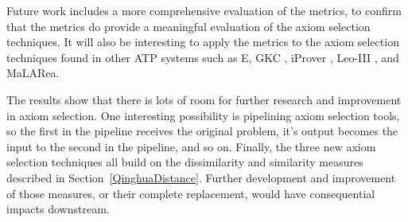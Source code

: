 \documentclass[EPiC]{easychair}
\begin{document}
Future work includes a more comprehensive evaluation of the metrics, to
confirm that the metrics do provide a meaningful evaluation of the axiom
selection techniques.
It will also be interesting to apply the metrics to the axiom selection
techniques found in other ATP systems such as E, GKC \cite{Tam19},
iProver \cite{Kor08}, Leo-III \cite{SB18}, and MaLARea.

The results show that there is lots of room for further research and 
improvement in axiom selection.
One interesting possibility is pipelining axiom selection tools, so
the first in the pipeline receives the original problem, it's output
becomes the input to the second in the pipeline, and so on.
Finally, the three new axiom selection techniques all build on the
dissimilarity and similarity measures described in 
Section~\ref{QinghuaDistance}.
Further development and improvement of those measures, or their complete
replacement, would have consequential impacts downstream.

\label{sect:bib}


\end{document}
